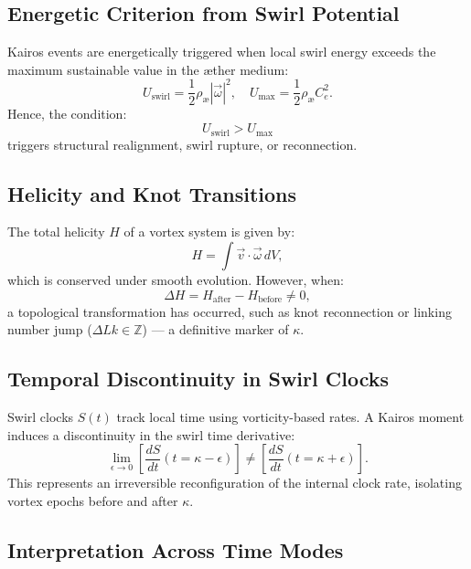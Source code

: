 \documentclass[12pt]{article}
\begin{document}
    \subsection*{Energetic Criterion from Swirl Potential}
    Kairos events are energetically triggered when local swirl energy exceeds the maximum sustainable value in the æther medium:
    \begin{equation}
        U_{\text{swirl}} = \frac{1}{2} \rho_{\text{\ae}} |\vec{\omega}|^2,
        \quad
        U_{\text{max}} = \frac{1}{2} \rho_{\text{\ae}} C_e^2.
    \end{equation}
    Hence, the condition:
    \[
        U_{\text{swirl}} > U_{\text{max}}
    \]
    triggers structural realignment, swirl rupture, or reconnection.

    \subsection*{Helicity and Knot Transitions}
    The total helicity \( H \) of a vortex system is given by:
    \begin{equation}
        H = \int \vec{v} \cdot \vec{\omega} \, dV,
    \end{equation}
    which is conserved under smooth evolution. However, when:
    \[
        \Delta H = H_{\text{after}} - H_{\text{before}} \neq 0,
    \]
    a topological transformation has occurred, such as knot reconnection or linking number jump (\( \Delta Lk \in \mathbb{Z} \)) — a definitive marker of \( \kappa \).

    \subsection*{Temporal Discontinuity in Swirl Clocks}
    Swirl clocks \( S(t) \) track local time using vorticity-based rates. A Kairos moment induces a discontinuity in the swirl time derivative:
    \begin{equation}
        \lim_{\epsilon \to 0} \left[ \frac{dS}{dt}(t = \kappa - \epsilon) \right]
        \neq
        \left[ \frac{dS}{dt}(t = \kappa + \epsilon) \right].
    \end{equation}
    This represents an irreversible reconfiguration of the internal clock rate, isolating vortex epochs before and after \( \kappa \).

    \subsection*{Interpretation Across Time Modes}
\end{document}
